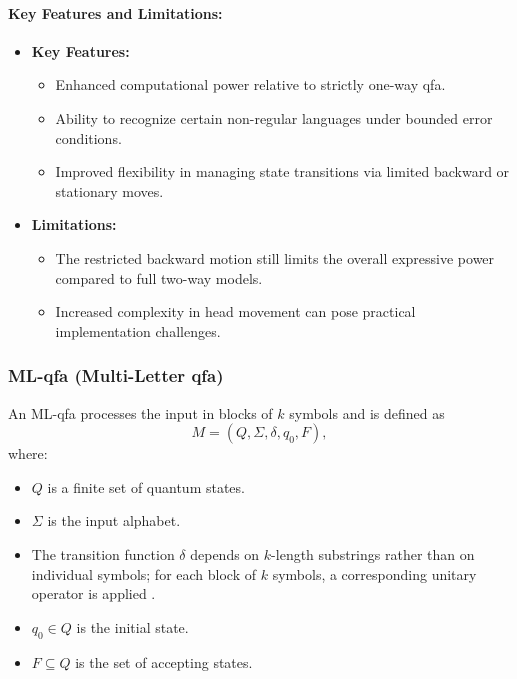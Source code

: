 \paragraph{Key Features and Limitations:}
\begin{itemize}
    \item \textbf{Key Features:}
    \begin{itemize}
        \item Enhanced computational power relative to strictly one-way qfa.
        \item Ability to recognize certain non-regular languages under bounded error conditions.
        \item Improved flexibility in managing state transitions via limited backward or stationary moves.
    \end{itemize}
    \item \textbf{Limitations:}
    \begin{itemize}
        \item The restricted backward motion still limits the overall expressive power compared to full two-way models.
        \item Increased complexity in head movement can pose practical implementation challenges.
    \end{itemize}
\end{itemize}

\subsubsection{ML-qfa (Multi-Letter qfa)}
\label{sssec:ml-qfa}
\begin{definition}[ML-qfa]
An ML-qfa processes the input in blocks of \( k \) symbols and is defined as 
\[
M = (Q, \Sigma, \delta, q_0, F),
\]
where:
\begin{itemize}
    \item \( Q \) is a finite set of quantum states.
    \item \( \Sigma \) is the input alphabet.
    \item The transition function \(\delta\) depends on \( k \)-length substrings rather than on individual symbols; for each block of \( k \) symbols, a corresponding unitary operator is applied \cite{belovs2007multi}.
    \item \( q_0 \in Q \) is the initial state.
    \item \( F \subseteq Q \) is the set of accepting states.
\end{itemize}
\end{definition}

